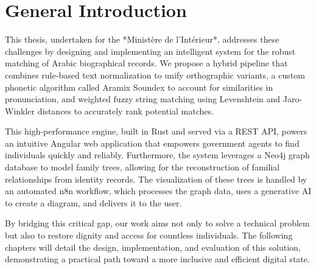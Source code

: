 \chapter*{General Introduction}

This thesis, undertaken for the *Ministère de l'Intérieur*, addresses these challenges by designing and implementing an intelligent system for the robust matching of Arabic biographical records. We propose a hybrid pipeline that combines rule-based text normalization to unify orthographic variants, a custom phonetic algorithm called Aramix Soundex to account for similarities in pronunciation, and weighted fuzzy string matching using Levenshtein and Jaro-Winkler distances to accurately rank potential matches.

This high-performance engine, built in Rust and served via a REST API, powers an intuitive Angular web application that empowers government agents to find individuals quickly and reliably. Furthermore, the system leverages a Neo4j graph database to model family trees, allowing for the reconstruction of familial relationships from identity records. The visualization of these trees is handled by an automated n8n workflow, which processes the graph data, uses a generative AI to create a diagram, and delivers it to the user.

By bridging this critical gap, our work aims not only to solve a technical problem but also to restore dignity and access for countless individuals. The following chapters will detail the design, implementation, and evaluation of this solution, demonstrating a practical path toward a more inclusive and efficient digital state.